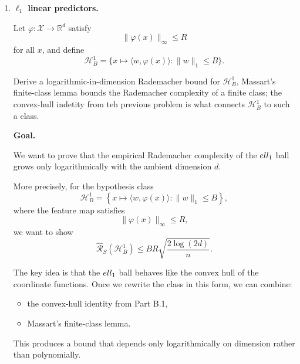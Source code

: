 \documentclass[11pt]{article}
\newcommand{\R}{\mathbb{R}}
\begin{document}
\begin{enumerate}
\begin{solutionbox}
This fact is one of the core reasons why boosting and convex aggregation methods remain analyzable using the complexity of the underlying base class.

\medskip

\textbf{Lean formalization artifact.}

A supporting Lean 4 formalization for this convex-hull identity is included in
\[
\texttt{src/lean/Assignment7\_B1\_ConvexHull.lean}.
\]

\end{solutionbox}

\item \textbf{$\ell_1$ linear predictors.}

Let $\varphi:\mathcal X\to\R^d$ satisfy
\[
\|\varphi(x)\|_\infty\le R
\]
for all $x$, and define
\[
\mathcal H_B^1
=
\{x\mapsto \langle w,\varphi(x)\rangle : \|w\|_1\le B\}.
\]

Derive a logarithmic-in-dimension Rademacher bound for $\mathcal H_B^1$, Massart's finite-class lemma bounds the Rademacher complexity of a finite class; the convex-hull indetity from teh  previous problem is what connects $\mathcal H_B^1$ to such a class. 

\begin{solutionbox}

\textbf{Goal.}

We want to prove that the empirical Rademacher complexity of the $\\ell_1$ ball grows only logarithmically with the ambient dimension $d$.

More precisely, for the hypothesis class
\[
\mathcal H_B^1
=
\left\{
x\mapsto \langle w,\varphi(x)\rangle :
\|w\|_1\le B
\right\},
\]
where the feature map satisfies
\[
\|\varphi(x)\|_\infty\le R,
\]
we want to show
\[
\widehat{\mathcal R}_S(\mathcal H_B^1)
\le
BR
\sqrt{
\frac{2\log(2d)}{n}
}.
\]

The key idea is that the $\\ell_1$ ball behaves like the convex hull of the coordinate functions. Once we rewrite the class in this form, we can combine:
\begin{itemize}
    \item the convex-hull identity from Part B.1,
    \item Massart's finite-class lemma.
\end{itemize}

This produces a bound that depends only logarithmically on dimension rather than polynomially.


\end{solutionbox}
\end{enumerate}
\end{document}
